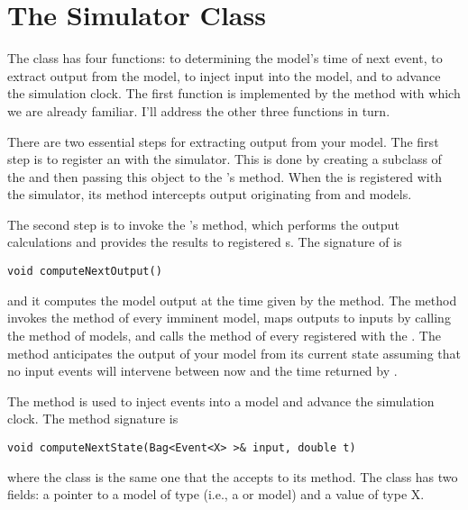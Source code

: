 \chapter{The Simulator Class}
The  class has four functions: to determining the model's time of next event, to extract output from the model, to inject input into the model, and to advance the simulation clock. The first function is implemented by the  method with which we are already familiar. I'll address the other three functions in turn. 

There are two essential steps for extracting output from your model. The first step is to register an  with the simulator. This is done by creating a subclass of the  and then passing this object to the 's  method. When the  is registered with the simulator, its  method intercepts output originating from  and  models.

The second step is to invoke the 's  method, which performs the output calculations and provides the results to registered s. The signature of  is
\begin{verbatim}
void computeNextOutput()
\end{verbatim}
and it computes the model output at the time given by the  method. The  method invokes the  method of every imminent  model, maps outputs to inputs by calling the  method of  models, and calls the  method of every  registered with the . The  method anticipates the output of your model from its current state assuming that no input events will intervene between now and the time returned by .

The  method is used to inject events into a model and advance the simulation clock. The method signature is
\begin{verbatim}
void computeNextState(Bag<Event<X> >& input, double t)
\end{verbatim}
where the  class is the same one that the  accepts to its  method. The  class has two fields: a pointer to a model of type  (i.e., a  or  model) and a value of type X. 

